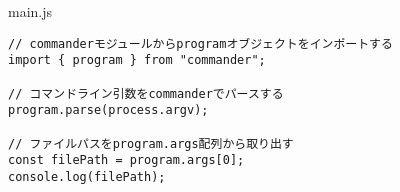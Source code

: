 \begin{listtitle}
main.js
\end{listtitle}
\begin{lstlisting}
// commanderモジュールからprogramオブジェクトをインポートする
import { program } from "commander";

// コマンドライン引数をcommanderでパースする
program.parse(process.argv);

// ファイルパスをprogram.args配列から取り出す
const filePath = program.args[0];
console.log(filePath);
\end{lstlisting}
\listend
